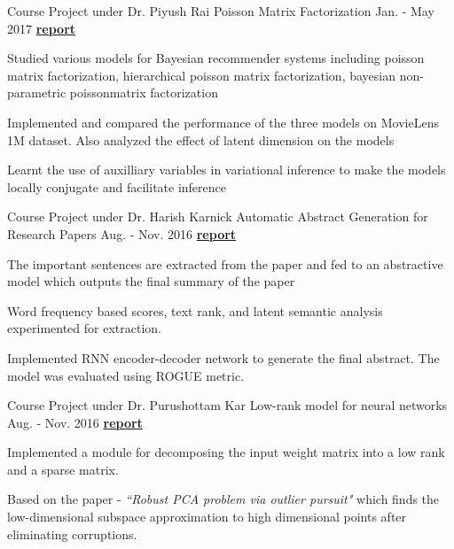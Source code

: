 \begin{cventries}
	\cventry
	{
		Course Project under Dr. Piyush Rai
	} %
	{Poisson Matrix Factorization} %
	{Jan. - May 2017} %
	{\textbf{\href{https://www.dropbox.com/s/a5gn52k0ggf8m5w/poisson-matrix-factorization.pdf?dl=0}{report \ExternalLink}}} %
	{
		\begin{cvitems} %
			\item {Studied various models for Bayesian recommender systems including poisson matrix factorization, hierarchical poisson matrix factorization, bayesian non-parametric poissonmatrix factorization}
			\item {Implemented and compared the performance of the three models on MovieLens 1M dataset. Also analyzed the effect of latent dimension on the models}
			\item {Learnt the use of auxilliary variables in variational inference to make the models locally conjugate and facilitate inference}
		\end{cvitems}
	}

	\cventry
	{Course Project under Dr. Harish Karnick} %
	{Automatic Abstract Generation for Research Papers} %
	{Aug. - Nov. 2016} %
	{\textbf{\href{https://www.dropbox.com/s/h5jqpm20l8bhan6/G4-FinalReport.pdf?dl=0}{report \ExternalLink}}} %
	{
		\begin{cvitems} %
			\item {
				The important sentences are extracted from the paper and fed to an abstractive model which outputs the final summary of the paper
			}
			\item {
				Word frequency based scores, text rank, and latent semantic analysis experimented for extraction. 
			}
			\item {
				Implemented RNN encoder-decoder network to generate the final abstract. The model was evaluated using ROGUE metric.
			}
		\end{cvitems}
	}	
	\cventry
	{Course Project under Dr. Purushottam Kar} %
	{Low-rank model for neural networks} %
	{Aug. - Nov. 2016} %
	{
		\textbf{\href{https://www.dropbox.com/s/wb51nni96m6s1nr/Final\%20Project\%20Report.pdf?dl=0}{report \ExternalLink}}	
	} %
	{
		\begin{cvitems} %
			\item { 
				Implemented a module for decomposing the input weight matrix into a low rank and a sparse matrix.
			}
			\item { 
				Based on the paper - \textit{``Robust PCA problem via outlier pursuit"} which finds the low-dimensional subspace approximation to high dimensional points after eliminating corruptions.
			}
		\end{cvitems}
	}



\end{cventries}
